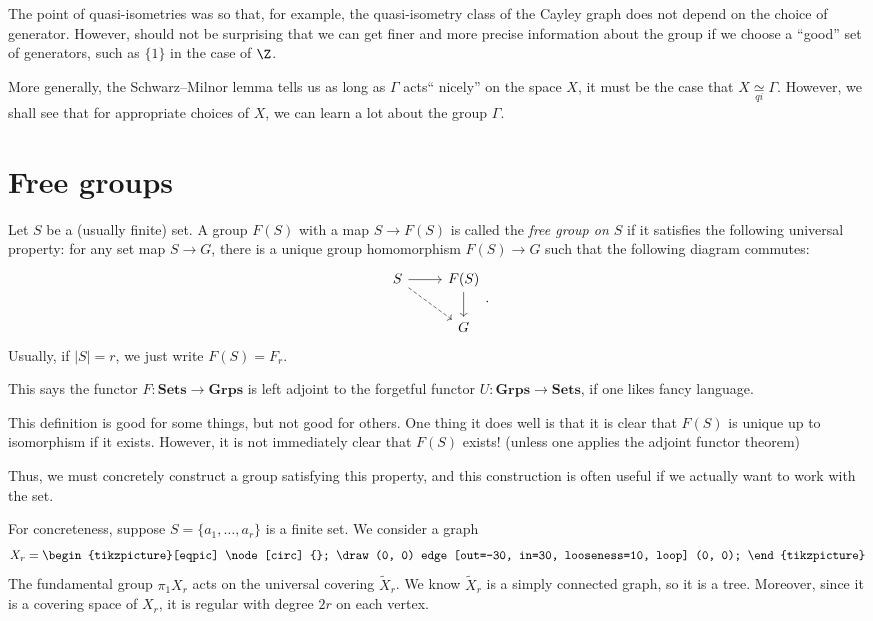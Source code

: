 \documentclass[a4paper]{article}
\newcommand{\qi}{\underset{qi}{\simeq}}
\begin{document}
The point of quasi-isometries was so that, for example, the quasi-isometry class of the Cayley graph does not depend on the choice of generator. However, should not be surprising that we can get finer and more precise information about the group if we choose a ``good'' set of generators, such as $\{1\}$ in the case of $\Z$.

More generally, the Schwarz--Milnor lemma tells us as long as $\Gamma$ acts`` nicely'' on the space $X$, it must be the case that $X \qi \Gamma$. However, we shall see that for appropriate choices of $X$, we can learn a lot about the group $\Gamma$.

\section{Free groups}
\begin{defi}
  Let $S$ be a (usually finite) set. A group $F(S)$ with a map $S \to F(S)$ is called the \emph{free group on $S$} if it satisfies the following universal property: for any set map $S \to G$, there is a unique group homomorphism $F(S) \to G$ such that the following diagram commutes:
  \[
    \begin{tikzcd}
      S \ar[r] \ar[rd, dashed] & F(S) \ar[d]\\
      & G
    \end{tikzcd}.
  \]
  Usually, if $|S| = r$, we just write $F(S) = F_r$.
\end{defi}
This says the functor $F: \mathbf{Sets} \to \mathbf{Grps}$ is left adjoint to the forgetful functor $U: \mathbf{Grps} \to \mathbf{Sets}$, if one likes fancy language.

This definition is good for some things, but not good for others. One thing it does well is that it is clear that $F(S)$ is unique up to isomorphism if it exists. However, it is not immediately clear that $F(S)$ exists! (unless one applies the adjoint functor theorem)

Thus, we must concretely construct a group satisfying this property, and this construction is often useful if we actually want to work with the set.

For concreteness, suppose $S = \{a_1, \ldots, a_r\}$ is a finite set. We consider a graph
\[
  X_r =
  \begin{tikzpicture}[eqpic]
    \node [circ] {};
    \draw (0, 0) edge [out=-30, in=30, looseness=10, loop] (0, 0);
  \end{tikzpicture}
\]
The fundamental group $\pi_1 X_r$ acts on the universal covering $\tilde{X}_r$. We know $\tilde{X}_r$ is a simply connected graph, so it is a tree. Moreover, since it is a covering space of $X_r$, it is regular with degree $2r$ on each vertex. %
\end{document}
